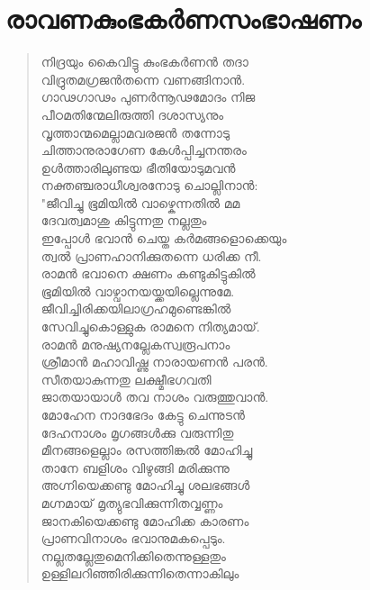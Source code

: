 
\section{രാവണകുംഭകര്‍ണസംഭാഷണം}

\begin{verse}
നിദ്രയും കൈവിട്ടു കുംഭകര്‍ണന്‍ തദാ\\
വിദ്രുതമഗ്രജന്‍തന്നെ വണങ്ങിനാന്‍.\\
ഗാഢഗാഢം പുണര്‍ന്നൂഢമോദം നിജ\\
പീഠമതിന്മേലിരുത്തി ദശാസ്യനും\\
വൃത്താന്മമെല്ലാമവരജന്‍ തന്നോടു\\
ചിത്താനുരാഗേണ കേള്‍പ്പിച്ചനന്തരം\\
ഉള്‍ത്താരിലുണ്ടയ ഭീതിയോടുമവന്‍\\
നക്തഞ്ചരാധീശ്വരനോടു ചൊല്ലിനാന്‍:\\
"ജീവിച്ചു ഭൂമിയില്‍ വാഴ്കെന്നതില്‍ മമ\\
ദേവത്വമാശു കിട്ടുന്നതു നല്ലതും\\
ഇപ്പോള്‍ ഭവാന്‍ ചെയ്ത കര്‍മങ്ങളൊക്കെയും\\
ത്വല്‍ പ്രാണഹാനിക്കുതന്നെ ധരിക്ക നീ.\\
രാമന്‍ ഭവാനെ ക്ഷണം കണ്ടുകിട്ടുകില്‍\\
ഭൂമിയില്‍ വാഴ്വാനയയ്ക്കയില്ലെന്നുമേ.\\
ജീവിച്ചിരിക്കയിലാഗ്രഹമുണ്ടെങ്കില്‍\\
സേവിച്ചുകൊള്ളുക രാമനെ നിത്യമായ്.\\
രാമന്‍ മനുഷ്യനല്ലേകസ്വരൂപനാം\\
ശ്രീമാന്‍ മഹാവിഷ്ണു നാരായണന്‍ പരന്‍.\\
സീതയാകുന്നതു ലക്ഷ്മീഭഗവതി\\
ജാതയായാള്‍ തവ നാശം വരുത്തുവാന്‍.\\
മോഹേന നാദഭേദം കേട്ടു ചെന്നുടന്‍\\
ദേഹനാശം മൃഗങ്ങള്‍ക്കു വരുന്നിതു\\
മീനങ്ങളെല്ലാം രസത്തിങ്കല്‍ മോഹിച്ചു\\
താനേ ബളിശം വിഴുങ്ങി മരിക്കുന്നു\\
അഗ്നിയെക്കണ്ടു മോഹിച്ചു ശലഭങ്ങള്‍\\
മഗ്നമായ് മൃത്യുഭവിക്കുന്നിതവ്വണ്ണം\\
ജാനകിയെക്കണ്ടു മോഹിക്ക കാരണം\\
പ്രാണവിനാശം ഭവാനുമകപ്പെടും.\\
നല്ലതല്ലേതുമെനിക്കിതെന്നുള്ളതും\\
ഉള്ളിലറിഞ്ഞിരിക്കുന്നിതെന്നാകിലും\\

\end{verse}
